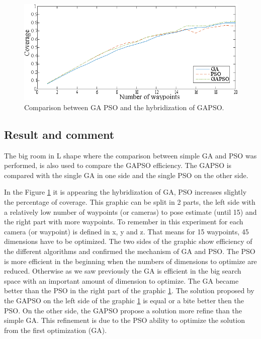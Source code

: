 \begin{figure}[t]
  \includegraphics[width=\linewidth]{img/GAPSO_GA_PSO3waypoint.eps}
  \caption{Comparison between GA PSO and the hybridization of GAPSO.
}\label{fig:GAPSO}
  \endminipage\hfill
\end{figure}

 \subsection{Result and comment }
  

The big room in L shape where the comparison between simple GA and PSO was performed, is also used to compare the GAPSO efficiency. The GAPSO is compared with the single GA in one side and the single PSO on the other side. 

In the Figure \ref{fig:GAPSO} it is appearing the hybridization of GA, PSO increases slightly the percentage of coverage.%
This graphic can be split in 2 parts, the left side with a relatively low number of waypoints (or cameras) to pose estimate (until 15) and the right part with more waypoints. To remember in this experiment for each camera (or waypoint) is defined in x, y and z. That means for 15 waypoints, 45 dimensions have to be optimized.
The two sides of the graphic show efficiency of the different algorithms and confirmed the mechanism of GA and PSO.
The PSO is more efficient in the beginning when the numbers of dimensions to optimize are reduced. Otherwise as we saw previously the GA is efficient in the big search space with an important amount of dimension to optimize. The GA became better than the PSO in the right part of the graphic \ref{fig:GAPSO}. 
The solution  proposed by the GAPSO on the left side of the graphic \ref{fig:GAPSO} is equal or a bite better then the PSO. On the other side, the GAPSO propose a solution more refine than the simple GA. This refinement is due to the PSO ability to optimize the solution from the first optimization (GA). 


